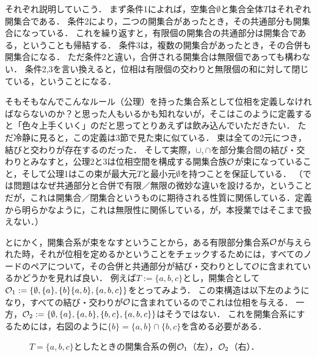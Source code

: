 \documentclass[11pt,a4paper, dvipdfmx]{jsarticle}
\begin{document}
それぞれ説明していこう．
まず条件1によれば，空集合$\emptyset$と集合全体$T$はそれぞれ開集合である．
条件2により，二つの開集合があったとき，その共通部分も開集合になっている．
これを繰り返すと，有限個の開集合の共通部分は開集合である，ということも帰結する．
条件3は，複数の開集合があったとき，その合併も開集合になる．
ただ条件2と違い，合併される開集合は無限個であっても構わない．
条件2,3を言い換えると，位相は有限個の交わりと無限個の和に対して閉じている，ということになる．

そもそもなんでこんなルール（公理）を持った集合系として位相を定義しなければならないのか？と思った人もいるかも知れないが，そこはこのように定義すると「色々上手くいく」のだと思ってとりあえずは飲み込んでいただきたい．
ただ冷静に見ると，この定義は3節で見た束に似ている．
束は全ての2元につき，結びと交わりが存在するのだった．
そして実際，$\cup,\cap$を部分集合間の結び・交わりとみなすと，公理2と3は位相空間を構成する開集合族$\mathcal{O}$が束になっていること，そして公理1はこの束が最大元$T$と最小元$\emptyset$を持つことを保証している．
（では問題はなぜ共通部分と合併で有限／無限の微妙な違いを設けるか，ということだが，これは開集合／閉集合というものに期待される性質に関係している．定義から明らかなように，これは無限性に関係している，が，本授業ではそこまで扱えない．）

とにかく，開集合系が束をなすということから，ある有限部分集合系$\mathcal{O}$が与えられた時，それが位相を定めるかということをチェックするためには，すべてのノードのペアについて，その合併と共通部分が結び・交わりとして$\mathcal{O}$に含まれているかどうかを見れば良い．
例えば$T:=\{a, b, c\}$とし，開集合として$\mathcal{O}_1 := \{ \emptyset, \{a \}, \{b\} \{a,b\}, \{a,b,c\} \}$をとってみよう．
この束構造は以下左のようになり，すべての結び・交わりが$\mathcal{O}$に含まれているのでこれは位相を与える．
一方，$\mathcal{O}_2 := \{ \emptyset, \{a \}, \{a,b\}, \{b,c\}, \{a,b,c\} \}$はそうではない．
これを開集合系にするためには，右図のように$\{b\} =  \{a,b\} \cap \{b,c\}$を含める必要がある．
\begin{figure}[h]
    \centering
    \caption{$T = \{a, b, c\}$としたときの開集合系の例$\mathcal{O}_1$（左），$\mathcal{O}_2$（右）．}
    \label{fig:3bool} 
\end{figure}
\end{document}
